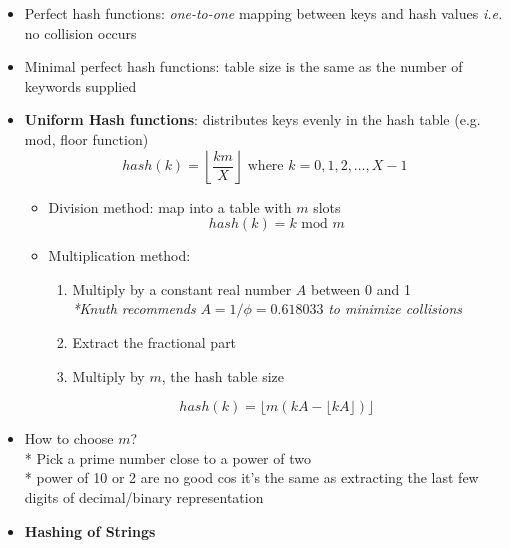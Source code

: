 \documentclass{article}
\newcommand{\ie}[0]{\textit{i.e. }}
\begin{document}
\begin{multicols}{2}
\begin{itemize}
\begin{itemize}
        \item Perfect hash functions: \textit{one-to-one} mapping between keys and hash values \ie no collision occurs
        \item Minimal perfect hash functions: table size is the same as the number of keywords supplied
        \item \textbf{Uniform Hash functions}: distributes keys evenly in the hash table (e.g. mod, floor function)
        $$hash(k) = \left\lfloor \frac{km}{X}\right\rfloor \text{ where } k=0,1,2,\dots,X-1$$
        \begin{itemize}
        	\item Division method: map into a table with $m$ slots
        	$$hash(k) = k \text{ mod }m$$
        	\item Multiplication method:
        	\begin{enumerate}
        		\item Multiply by a constant real number $A$ between 0 and 1\\
        		\textit{*Knuth recommends} $A = 1/\phi=0.618033$ \textit{to minimize collisions}
        		\item Extract the fractional part
        		\item Multiply by $m$, the hash table size
        	\end{enumerate}
        $$hash(k) = \lfloor m (kA- \lfloor kA \rfloor ) \rfloor$$
        \end{itemize}
        \item How to choose $m$?\\
        * Pick a prime number close to a power of two\\
        * power of 10 or 2 are no good cos it's the same as extracting the last few digits of decimal/binary representation
        \item \textbf{Hashing of Strings}
        \end{itemize}
\end{itemize}

\end{multicols}
\end{document}
